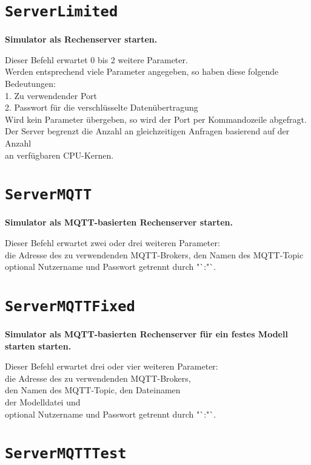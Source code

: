 \section{\texttt{ServerLimited}}

\textbf{Simulator als Rechenserver starten.}

Dieser Befehl erwartet 0 bis 2 weitere Parameter.\\
Werden entsprechend viele Parameter angegeben, so haben diese folgende Bedeutungen:\\
1. Zu verwendender Port\\
2. Passwort für die verschlüsselte Datenübertragung\\
Wird kein Parameter übergeben, so wird der Port per Kommandozeile abgefragt.\\
Der Server begrenzt die Anzahl an gleichzeitigen Anfragen basierend auf der Anzahl\\
an verfügbaren CPU-Kernen.

\section{\texttt{ServerMQTT}}

\textbf{Simulator als MQTT-basierten Rechenserver starten.}

Dieser Befehl erwartet zwei oder drei weiteren Parameter:\\
die Adresse des zu verwendenden MQTT-Brokers, den Namen des MQTT-Topic optional Nutzername und Passwort getrennt durch "`:"`.

\section{\texttt{ServerMQTTFixed}}

\textbf{Simulator als MQTT-basierten Rechenserver für ein festes Modell starten starten.}

Dieser Befehl erwartet drei oder vier weiteren Parameter:\\
die Adresse des zu verwendenden MQTT-Brokers,\\
den Namen des MQTT-Topic, den Dateinamen\\
der Modelldatei und\\
optional Nutzername und Passwort getrennt durch "`:"`.

\section{\texttt{ServerMQTTTest}}

